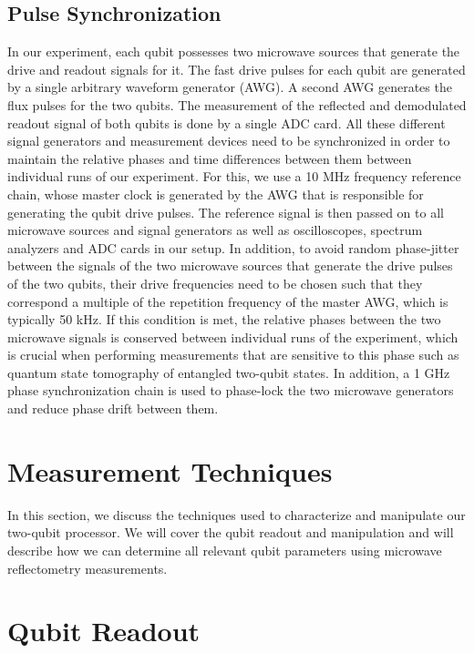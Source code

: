 \subsection{Pulse Synchronization}

In our experiment, each qubit possesses two microwave sources that generate the drive and readout signals for it. The fast drive pulses for each qubit are generated by a single arbitrary waveform generator (AWG). A second AWG generates the flux pulses for the two qubits. The measurement of the reflected and demodulated readout signal of both qubits is done by a single ADC card. All these different signal generators and measurement devices need to be synchronized in order to maintain the relative phases and time differences between them between individual runs of our experiment. For this, we use a 10 MHz frequency reference chain, whose master clock is generated by the AWG that is responsible for generating the qubit drive pulses. The reference signal is then passed on to all microwave sources and signal generators as well as oscilloscopes, spectrum analyzers and ADC cards in our setup. In addition, to avoid random phase-jitter between the signals of the two microwave sources that generate the drive pulses of the two qubits, their drive frequencies need to be chosen such that they correspond a multiple of the repetition frequency of the master AWG, which is typically 50 kHz. If this condition is met, the relative phases between the two microwave signals is conserved between individual runs of the experiment, which is crucial when performing measurements that are sensitive to this phase such as quantum state tomography of entangled two-qubit states. In addition, a 1 GHz phase synchronization chain is used to phase-lock the two microwave generators and reduce phase drift between them.

\section{Measurement Techniques}

In this section, we discuss the techniques used to characterize and manipulate our two-qubit processor. We will cover the qubit readout and manipulation and will describe how we can determine all relevant qubit parameters using microwave reflectometry measurements.

\section{Qubit Readout}

